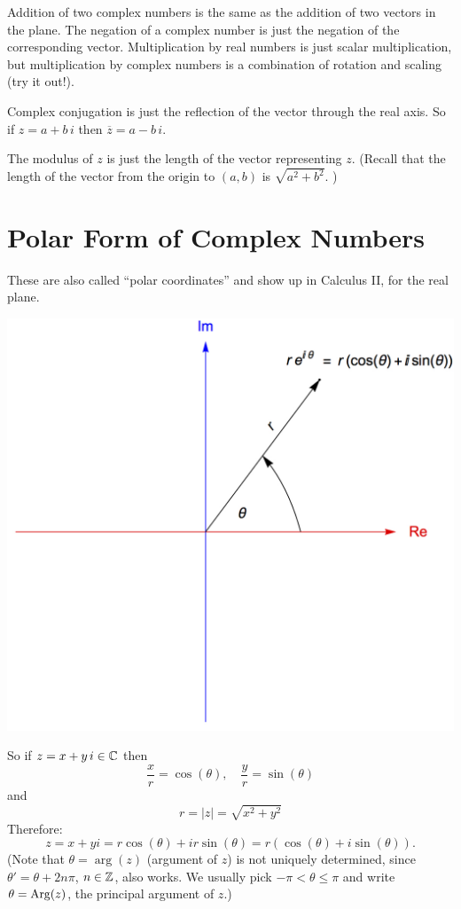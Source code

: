 Addition of two complex numbers is the same as the addition of
two vectors in the plane.  The negation of a complex number is
just the negation of the corresponding vector.  Multiplication
by real numbers is just scalar multiplication, but multiplication
by complex numbers is a combination of rotation and scaling
(try it out!).

Complex conjugation is just the reflection of the vector through the real
axis.  So if $z = a+b\,i$ then $\overline{z} = a-b\,i$.  

The modulus of $z$ is just the length of the vector representing $z$.
(Recall that the length of the vector from the origin to $(a,b)$ is
$\sqrt{a^2+b^2}$. )

\section{Polar Form of Complex Numbers} 



These are also called ``polar coordinates'' and show up in 
Calculus II, for the real plane.  


 \begin{center}
\includegraphics[scale=.5]{img/PolarForm.jpg}
\end{center}




So if $z = x+y\,i \in \mathbb{C}$ then 
$$
\frac{x}{r} = \cos(\theta), \quad \frac{y}{r} = \sin(\theta)
$$
and
$$
r = \vert z \vert = \sqrt{x^2+y^2}
$$
Therefore:  
$$
z = x+yi = r \cos(\theta) + i r\sin(\theta) = r(\cos(\theta)+i \sin(\theta)).
$$
(Note that $\theta = \arg(z)$ (argument of $z$) is not uniquely determined,
since $\theta' = \theta + 2n\pi$, $n\in \mathbb{Z}$, also works.  We usually
pick $-\pi < \theta \leq \pi$ and write $\theta = \operatorname{Arg}(z)$, the principal
argument of $z$.)

